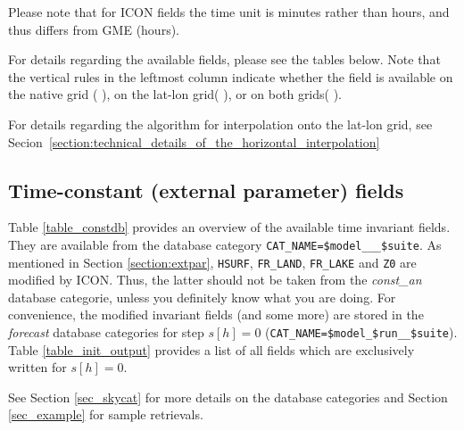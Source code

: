 Please note that for ICON fields the time unit is minutes rather than hours, and thus differs from GME (hours). 

For details regarding the available fields, please see the tables below. Note that the vertical rules in the leftmost column indicate whether the field is 
available on the native grid ($\,$\markRed$\,$), on the lat-lon grid($\,$\markBlue$\,$), or on both grids($\,$\markRed\markBlue$\,$). 

For details regarding the algorithm for interpolation onto the lat-lon grid, see Secion~\ref{section:technical_details_of_the_horizontal_interpolation}


\subsection{Time-constant (external parameter) fields}

Table \ref{table_constdb} provides an overview of the available time invariant fields. They are available from the database category 
\texttt{CAT\_NAME=\$model\_\_\_\$suite}. As mentioned in Section \ref{section:extpar}, \texttt{HSURF}, 
\texttt{FR\_LAND}, \texttt{FR\_LAKE} and \texttt{Z0} are modified by ICON. Thus, the latter should not be taken from the \emph{const\_an} 
database categorie, unless you definitely know what you are doing. For convenience, the modified invariant fields (and some more) 
are stored in the \emph{forecast} database categories for step $s[h]=0$ (\texttt{CAT\_NAME=\$model\_\$run\_\_\$suite}). Table 
\ref{table_init_output} provides a list of all fields which are exclusively written for $s[h]=0$.

See Section \ref{sec_skycat} for more details on the database categories and Section \ref{sec_example} for sample retrievals.
 



